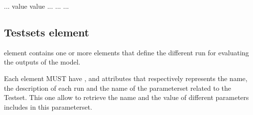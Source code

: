 \documentclass[letterpaper,13pt,english]{sphinxmanual}
\begin{document}
%
\begin{sphinxVerbatim}[commandchars=\\\{\}]
    
    ...
           
          
           value
           value
          ...
       ...
    ...
\end{sphinxVerbatim}


\subsection{Testsets element}
\label{\detokenize{user/description:testsets-element}}
\begin{DUlineblock}{0em}
\item[]  element contains one or more  elements that define the different run for evaluating the outputs of the model.
\end{DUlineblock}

\begin{DUlineblock}{0em}
\item[] Each  element MUST have ,  and  attributes that respectively represents the name,
the description of each run and the name of the parameterset related to the Testset. This one allow to retrieve the name and the value of different
parameters includes in this parameterset.
\end{DUlineblock}
\end{document}
